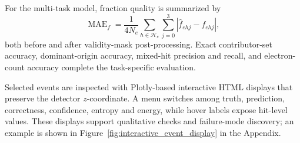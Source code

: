 For the multi-task model, fraction quality is summarized by
\begin{equation}
    \operatorname{MAE}_{f}
    =
    \frac{1}{4N_e}
    \sum_{h \in \mathcal{H}_e}
    \sum_{j=0}^{3}
    \left|\widehat{f}_{ehj}-f_{ehj}\right|,
    \label{eq:fraction_mae}
\end{equation}
both before and after validity-mask post-processing. Exact contributor-set
accuracy, dominant-origin accuracy, mixed-hit precision and recall, and
electron-count accuracy complete the task-specific evaluation.

Selected events are inspected with Plotly-based interactive HTML displays that
preserve the detector \(z\)-coordinate. A menu switches among truth,
prediction, correctness, confidence, entropy and energy, while hover labels
expose hit-level values. These displays support qualitative checks and
failure-mode discovery; an example is shown in
Figure~\ref{fig:interactive_event_display} in the Appendix.
